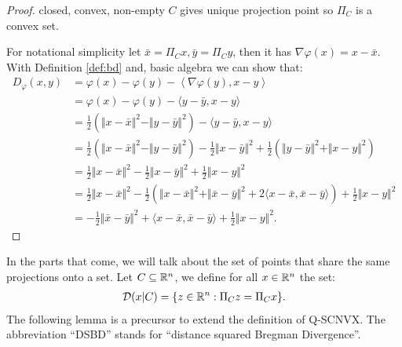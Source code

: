 \documentclass[12pt]{article}
\begin{document}
    \begin{proof}
        closed, convex, non-empty $C$ gives unique projection point so $\Pi_C$ is a convex set. 
        \par
        For notational simplicity let $\bar x = \Pi_C x, \bar y = \Pi_C y$, then it has $\nabla \varphi (x) = x - \bar x$. 
        With Definition \ref{def:bd} and, basic algebra we can show that: 
        \begin{align*}
            D_{\varphi}(x, y) &= 
            \varphi(x) - \varphi(y) - \left\langle \nabla \varphi(y), x - y\right\rangle
            \\
            &= \varphi(x) - \varphi(y) - \langle y - \bar y, x - y\rangle
            \\
            &= \frac{1}{2}(\Vert x - \bar x\Vert^2 - \Vert y - \bar y\Vert^2)
            - \langle y - \bar y, x - y\rangle
            \\
            &= \frac{1}{2}(\Vert x - \bar x\Vert^2 - \Vert y - \bar y\Vert^2)
            - \frac{1}{2}\Vert x - \bar y\Vert^2 
            + \frac{1}{2}\left(
                \Vert y - \bar y\Vert^2 + \Vert x - y\Vert^2
            \right)
            \\ 
            &= \frac{1}{2}\Vert x - \bar x\Vert^2
            - \frac{1}{2}\Vert x - \bar y\Vert^2 + \frac{1}{2}\Vert x - y\Vert^2
            \\
            &= 
            \frac{1}{2}\Vert x - \bar x\Vert^2
            - \frac{1}{2}\left(
                \Vert x - \bar x\Vert^2 + \Vert \bar x - \bar y\Vert^2
                + 2\langle x - \bar x, \bar x - \bar y\rangle
            \right)
            + \frac{1}{2}\Vert x - y\Vert^2
            \\
            &= - \frac{1}{2}\Vert \bar x - \bar y\Vert^2 + \langle x - \bar x, \bar x - \bar y\rangle 
            + \frac{1}{2}\Vert x - y \Vert^2. 
        \end{align*}
    \end{proof}
    \par
    In the parts that come, we will talk about the set of points that share the same projections onto a set.
    Let $C \subseteq \mathbb R^n$, we define for all $x \in \mathbb R^n$ the set: 
    \begin{align}
        \mathcal D(x | C) = \{z \in \mathbb R^n : \Pi_C z = \Pi_C x\}. 
    \end{align}
    The following lemma is a precursor to extend the definition of Q-SCNVX. 
    The abbreviation ``DSBD'' stands for ``distance squared Bregman Divergence''. 
\end{document}

